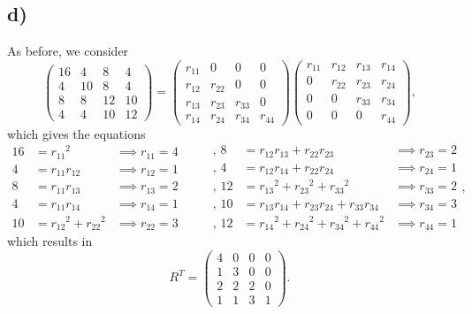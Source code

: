 \documentclass[12pt]{article}
\theoremstyle{definition}
\theoremstyle{definition}
\theoremstyle{definition}
\theoremstyle{definition}
\theoremstyle{definition}
\theoremstyle{example}
\theoremstyle{note}
\theoremstyle{remark}
\theoremstyle{example}
\begin{document}
			\subsection*{d) }
				As before, we consider 
				$$ \begin{pmatrix}
					16 & 4 & 8 & 4 \\
					4 & 10 & 8 & 4 \\
					8 & 8 & 12 & 10 \\
					4 & 4 & 10 & 12
				\end{pmatrix}
				= 
				\begin{pmatrix}
				r_{11} & 0 & 0 & 0 \\
				r_{12}	& r_{22} & 0 & 0 \\
				r_{13} & r_{23} & r_{33} & 0\\
				r_{14} & r_{24} & r_{34} & r_{44}
				\end{pmatrix}
				\begin{pmatrix}
				r_{11} & r_{12} & r_{13} & r_{14} \\
				0 &r_{22} & r_{23} & r_{24} \\
				0 & 0 & r_{33} & r_{34 } \\
				0 & 0 & 0 & r_{44}
				\end{pmatrix}
				,$$
				which gives the equations 
				$$ \begin{aligned}
					16 &= {r_{11}}^{2} &\implies r_{11} =4 \\
					4 &= r_{11}r_{12} &\implies r_{12} = 1 \\
					8 &= r_{11}r_{13} &\implies r_{13} = 2 \\
					4 &= r_{11}r_{14} &\implies r_{14} = 1 \\
					10 &= {r_{12}}^{2} + {r_{22}}^{2} &\implies r_{22} =3 
				\end{aligned} 
				\qquad  
				\begin{aligned}
					, \, 8 &= r_{12} r_{13} +r_{22}r_{23} &\implies r_{23} =2 \\
					, \, 4 &= r_{12} r_{14} + r_{22}r_{24} &\implies r_{24} =1 \\
					, \, 12 &= {r_{13}}^{2} + {r_{23}}^{2} + {r_{33}}^{2} &\implies  r_{33} = 2\\
					, \, 10 &= r_{13}r_{14} + r_{23} r_{24} + r_{33}r_{34} &\implies r_{34} = 3 \\
					, \, 12 &= {r_{14}}^{2} + {r_{24}}^{2} + {r_{34}}^{2} + {r_{44}}^{2} &\implies r_{44}=1
				\end{aligned},$$
				which results in 
				$$ R^{T} = \begin{pmatrix}
					4 & 0 & 0 & 0 \\
					1 & 3 & 0 & 0\\ 
					2 & 2 & 2 & 0 \\
					1 & 1 & 3 & 1
				\end{pmatrix}.$$
\end{document}
